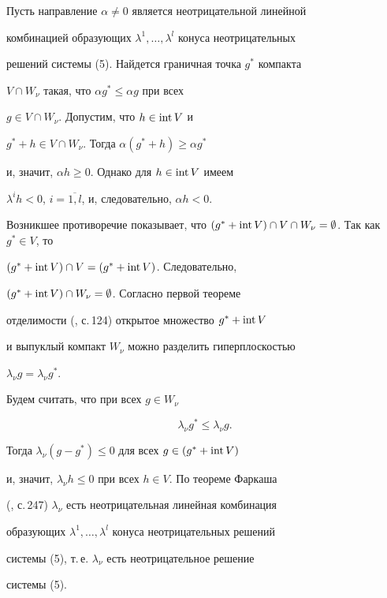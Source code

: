 \begin{pf}
Пусть направление $\alpha \ne 0$ является неотрицательной линейной


комбинацией образующих $\lambda^1,\dotsc,\lambda^l$ конуса неотрицательных


решений системы (5). Найдется граничная точка $g^*$ компакта


$V\cap W_\nu$ такая, что $\alpha g^* \le \alpha g$ при всех


$g\in V\cap W_\nu$. Допустим, что $h\in \operatorname{int} V$ и 


$g^* + h\in V\cap W_\nu$. Тогда $\alpha(g^* + h) \ge \alpha g^*$


и, значит, $\alpha h \ge 0$. Однако для $h\in\operatorname{int} V$ имеем


$\lambda^i h < 0$, $i=\overline{1,l}$, и, следовательно, $\alpha h < 0$.


Возникшее противоречие показывает, что $(g^* + \Int V)\cap V


\cap W_\nu = \emptyset$. Так как $g^*\in V$, то


$(g^* + \operatorname{int} V)\cap V = (g^* + \operatorname{int} V)$. Следовательно,


$(g^* + \operatorname{int} V)\cap W_\nu = \emptyset$. Согласно первой теореме


отделимости (\cite{9}, с.\,124) открытое множество $g^* + \operatorname{int} V$


и выпуклый компакт $W_\nu$ можно разделить гиперплоскостью


$\lambda_\nu g = \lambda_\nu g^*$.





Будем считать, что при всех $g\in W_\nu$


\begin{equation}


\lambda_\nu g^* \le \lambda_\nu g. 


\end{equation}


Тогда $\lambda_\nu(g - g^*)\le 0$ для всех $g\in(g^* + \operatorname{int} V)$


и, значит, $\lambda_\nu h \le 0$ при всех $h\in V$. По теореме Фаркаша


(\cite{7}, с.\,247) $\lambda_\nu$ есть неотрицательная линейная комбинация


образующих $\lambda^1,\dotsc,\lambda^l$ конуса неотрицательных решений


системы (5), т.\,е. $\lambda_\nu$ есть неотрицательное решение


системы (5).






\end{pf}
